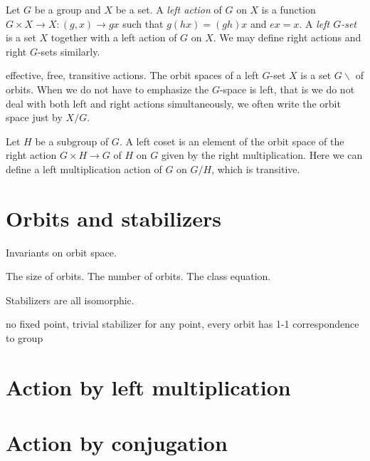 \documentclass{../../large}
\begin{document}
Let $G$ be a group and $X$ be a set.
A \emph{left action} of $G$ on $X$ is a function $G\times X\to X:(g,x)\to gx$ such that $g(hx)=(gh)x$ and $ex=x$.
A \emph{left $G$-set} is a set $X$ together with a left action of $G$ on $X$.
We may define right actions and right $G$-sets similarly.

effective, free, transitive actions.
The orbit spaces of a left $G$-set $X$ is a set $G\backslash$ of orbits.
When we do not have to emphasize the $G$-space is left, that is we do not deal with both left and right actions simultaneously, we often write the orbit space just by $X/G$.

Let $H$ be a subgroup of $G$.
A left coset is an element of the orbit space of the right action $G\times H\to G$ of $H$ on $G$ given by the right multiplication.
Here we can define a left multiplication action of $G$ on $G/H$, which is transitive.



\begin{prb}
\end{prb}





\section{Orbits and stabilizers}
Invariants on orbit space.

\begin{prb}
The size of orbits.
The number of orbits.
The class equation.
\end{prb}


\begin{prb}
\begin{parts}
\item Stabilizers are all isomorphic.
\end{parts}
\end{prb}

\begin{prb}
no fixed point,
trivial stabilizer for any point,
every orbit has 1-1 correspondence to group
\end{prb}

\section{Action by left multiplication}

\section{Action by conjugation}
\begin{prb}
\end{prb}
\end{document}
